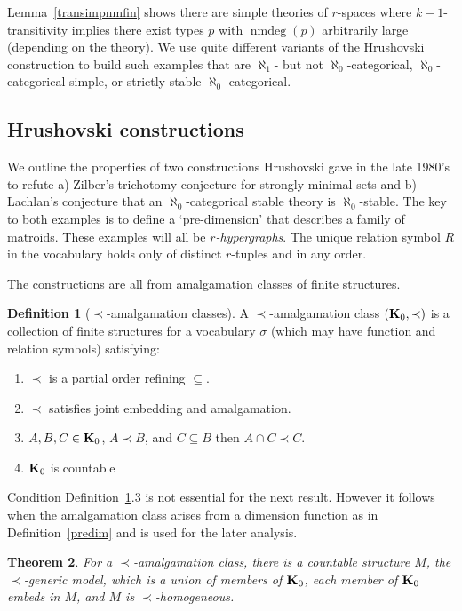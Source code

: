 \documentclass[11pt]{amsart}
\def\bK{{\bf K}}
\def\nmdeg{\mathop{\rm nmdeg}}
\def\nmdeg{\operatorname{nmdeg}}
\newtheorem{theorem}{Theorem}[section]
\theoremstyle{definition}
\newtheorem{definition}[theorem]{Definition}
\theoremstyle{remark}
\numberwithin{equation}{section}
\begin{document}
Lemma~\ref{transimpnmfin} shows there are simple theories of $r$-spaces where
$k-1$-transitivity implies there exist types $p$ with $\nmdeg(p)$ arbitrarily
large (depending on the theory). We use quite different variants of the
Hrushovski construction  to build such examples that are $\aleph_1$-  but not
$\aleph_0$-categorical, $\aleph_0$-categorical simple, or strictly stable
$\aleph_0$-categorical.


\subsection{Hrushovski constructions}

We outline the properties of two constructions  Hrushovski gave in the late
1980's to refute a) Zilber's trichotomy conjecture for strongly minimal sets
and b) Lachlan's conjecture that an $\aleph_0$-categorical stable theory is
$\aleph_0$-stable. The key to both examples is to define a `pre-dimension'
that describes a family of matroids. These examples will all be {\em
$r$-hypergraphs}. The unique relation symbol $R$ in the vocabulary holds only
of distinct $r$-tuples and
    in any order.

The constructions are all from amalgamation classes of finite structures.

\begin{definition}[$\prec$-amalgamation classes]\label{amalclassdef}
A $\prec$-amalgamation class $(\bK_0,\prec)$ is a collection of finite
structures
 for a vocabulary $\sigma$ (which may have function and relation symbols) satisfying:
\begin{enumerate}

\item $\prec$ is a partial order refining $\subseteq$.
\item $\prec$ satisfies joint embedding and amalgamation.
\item $A,B,C\in \bK_0$, $A \prec B$, and $C\subseteq B$ then $A\cap C \prec
    C$.
\item  $\bK_0$ is countable
\end{enumerate}
\end{definition}

Condition Definition~\ref{amalclassdef}.3 is not essential for the next
result.  However it follows when the amalgamation class arises from a
dimension function as in Definition~\ref{predim} and is used for the later
analysis.

\begin{theorem}\label{genexist}
For a $\prec$-amalgamation class, there is a  countable structure $M$,  the
{\em $\prec$-generic model}, which is a union of members of $\bK_0$, each
member of $\bK_0$ embeds in $M$, and $M$ is $\prec$-homogeneous.
\end{theorem}
\end{document}
